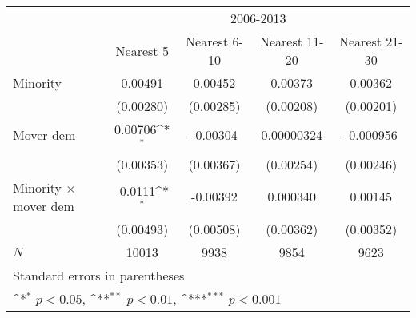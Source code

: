 {
\def\sym#1{\ifmmode^{#1}\else\(^{#1}\)\fi}
\begin{tabular}{l*{4}{c}}
\hline\hline
            &\multicolumn{4}{c}{2006-2013}                                                          \\\cmidrule(lr){2-5}
            &\multicolumn{1}{c}{Nearest 5}&\multicolumn{1}{c}{Nearest 6-10}&\multicolumn{1}{c}{Nearest 11-20}&\multicolumn{1}{c}{Nearest 21-30}\\
\hline
Minority    &     0.00491         &     0.00452         &     0.00373         &     0.00362         \\
            &   (0.00280)         &   (0.00285)         &   (0.00208)         &   (0.00201)         \\
[1em]
Mover dem   &     0.00706\sym{*}  &    -0.00304         &  0.00000324         &   -0.000956         \\
            &   (0.00353)         &   (0.00367)         &   (0.00254)         &   (0.00246)         \\
[1em]
Minority $\times$ mover dem&     -0.0111\sym{*}  &    -0.00392         &    0.000340         &     0.00145         \\
            &   (0.00493)         &   (0.00508)         &   (0.00362)         &   (0.00352)         \\
\hline
\(N\)       &       10013         &        9938         &        9854         &        9623         \\
\hline\hline
\multicolumn{5}{l}{\footnotesize Standard errors in parentheses}\\
\multicolumn{5}{l}{\footnotesize \sym{*} \(p<0.05\), \sym{**} \(p<0.01\), \sym{***} \(p<0.001\)}\\
\end{tabular}
}
